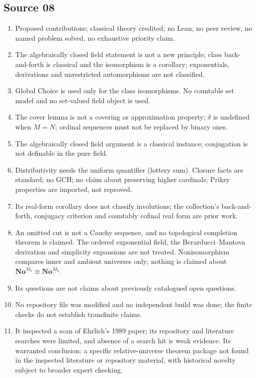 \documentclass[11pt,letterpaper]{article}
\numberwithin{equation}{section}
\theoremstyle{definition}
\theoremstyle{remark}
\newcommand{\No}{\mathbf{No}}
\begin{document}
\subsection*{Source 08}
\begin{enumerate}[label=08.\arabic*,leftmargin=3.2em]
\item Proposed contributions; classical theory credited; no Lean, no peer
review, no named problem solved, no exhaustive priority claim.
\item The algebraically closed field statement is not a new principle; class
back-and-forth is classical and the isomorphism is a corollary; exponentials,
derivations and unrestricted automorphisms are not classified.
\item Global Choice is used only for the class isomorphisms. No countable set
model and no set-valued field object is used.
\item The cover lemma is not a covering or approximation property; $\delta$ is
undefined when $M=N$; ordinal sequences must not be replaced by binary ones.
\item The algebraically closed field argument is a classical instance;
conjugation is not definable in the pure field.
\item Distributivity needs the uniform quantifier (lottery sum). Closure facts
are standard; no GCH; no claim about preserving higher cardinals; Prikry
properties are imported, not reproved.
\item Its real-form corollary does not classify involutions; the collection's
back-and-forth, conjugacy criterion and countably cofinal real form are prior
work.
\item An omitted cut is not a Cauchy sequence, and no topological completion
theorem is claimed. The ordered exponential field, the Berarducci--Mantova
derivation and simplicity expansions are not treated. Nonisomorphism compares
inner and ambient universes only; nothing is claimed about
$\No^{M_1}\cong\No^{M_2}$.
\item Its questions are not claims about previously catalogued open questions.
\item No repository file was modified and no independent build was done; the
finite checks do not establish transfinite claims.
\item It inspected a scan of Ehrlich's 1989 paper; its repository and literature
searches were limited, and absence of a search hit is weak evidence. Its
warranted conclusion: a specific relative-universe theorem package not found in
the inspected literature or repository material, with historical novelty
subject to broader expert checking.
\end{enumerate}
\end{document}

